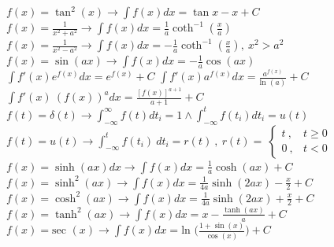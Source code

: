 \documentclass[12pt]{article}
\def\sec{\text{sec\ }} %
\def\ln{\text{ln\ }} %
\begin{document}
\begin{flushleft}
	\textbullet \quad $\displaystyle f(x) = \tan ^2(x) \rightarrow \int f(x) dx = \tan x -x + C $ \linebreak 
	\textbullet \quad $\displaystyle f(x) = \frac{1}{x^2+a^2} \rightarrow \int f(x) dx = \frac{1}{a} \coth ^{-1} \left(\frac{x}{a}\right) $ \linebreak 
	\textbullet \quad $\displaystyle f(x) = \frac{1}{x^2-a^2} \rightarrow \int f(x) dx = -\frac{1}{a} \coth ^{-1} \left( \frac{x}{a} \right), \ x^2 > a^2 $ \linebreak 
	\textbullet \quad $\displaystyle f(x) = \sin (ax) \rightarrow \int f(x) dx = -\frac{1}{a} \cos (ax) $ \linebreak 
	\textbullet \quad $\displaystyle \int f'(x) e^{f(x)} dx = e^{f(x)} + C$ \linebreak 
	\textbullet \quad $\displaystyle \int f'(x) a^{f(x)} dx = \frac{a^{f(x)}}{\ln(a)} + C $ \linebreak 
	\textbullet \quad $\displaystyle \int f'(x) \ \left(f(x)\right)^a dx = \frac{\left[ f(x) \right]^{a+1}}{a+1} + C $ \linebreak 
	\textbullet \quad $\displaystyle f(t) = \delta (t) \rightarrow \int_{-\infty}^{\infty} f(t) dt_i = 1 \land \int_{-\infty}^t f(t_i) dt_i = u(t) $ \linebreak 
	\textbullet \quad $\displaystyle f(t) = u(t) \rightarrow \int_{-\infty}^t f(t_i) \ dt_i = r(t)\ , \ r(t) = \ \begin{cases} t\ , & t\geq 0 \\ 0\ , & t < 0 \end{cases} $ \linebreak 
	\textbullet \quad $\displaystyle f(x) = \sinh (ax) dx \rightarrow \int f(x) dx = \frac{1}{a} \cosh (ax) + C$ \linebreak 
	\textbullet \quad $\displaystyle f(x) = \sinh ^2 (ax) \rightarrow \int f(x) dx = \frac{1}{4a} \sinh (2ax) - \frac{x}{2} + C$ \linebreak 
	\textbullet \quad $\displaystyle f(x) = \cosh ^2(ax) \rightarrow \int f(x) dx = \frac{1}{4a} \sinh (2ax) + \frac{x}{2} + C$ \linebreak 
	\textbullet \quad $\displaystyle f(x) = \tanh ^2(ax) \rightarrow \int f(x) dx = x - \frac{\tanh (ax)}{a} + C$ \linebreak 
	\textbullet \quad $\displaystyle f(x) = \sec (x) \rightarrow \int f(x) dx = \ln \big( \frac{1+\sin (x)}{\cos (x)} \big) + C$ \linebreak 


\end{flushleft}
\end{document}

